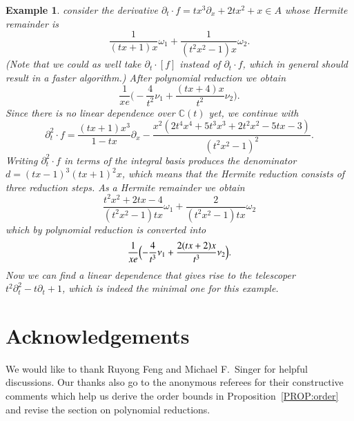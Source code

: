 \documentclass[final,1p,times,authoryear]{elsarticle}
\newtheorem{example}[theorem]{Example}
\newcommand{\bC}{ {\mathbb C}}
\begin{document}
\begin{example}
consider the derivative $\partial_t\cdot f=tx^3\partial_x+2tx^2+x\in A$ whose
Hermite remainder is
\[
  \frac{1}{(tx+1)x} \omega_1 + \frac{1}{(t^2x^2-1)x} \omega_2.
\]
(Note that we could as well take $\partial_t\cdot [f]$ instead of $\partial_t\cdot f$, which
in general should result in a faster algorithm.)
After polynomial reduction we obtain
\[
  \frac{1}{xe} \biggl( -\frac{4}{t^2} \nu_1 + \frac{(tx+4)x}{t^2} \nu_2 \biggr).
\]
Since there is no linear dependence over $\bC(t)$ yet, we continue with
\[
  \partial_t^2\cdot f =
  \frac{(tx+1)x^3}{1-tx} \partial_x -
  \frac{x^2(2t^4x^4+5t^3x^3+2t^2x^2-5tx-3)}{(t^2x^2-1)^2}.
\]
Writing $\partial_t^2\cdot f$ in terms of the integral basis produces the denominator
$d=(tx-1)^3(tx+1)^2x$, which means that the Hermite reduction consists of three
reduction steps. As a Hermite remainder we obtain
\[
  \frac{t^2x^2+2tx-4}{(t^2x^2-1)tx} \omega_1 + \frac{2}{(t^2x^2-1)tx} \omega_2
\]
which by polynomial reduction is converted into
\[
  \frac{1}{xe} \Bigl( -\frac{4}{t^3} \nu_1 + \frac{2(tx+2)x}{t^3} \nu_2 \Bigr).
\]
Now we can find a linear dependence that gives rise to the telescoper
$t^2\partial_t^2-t\partial_t+1$, which is indeed the minimal one for this example.
\end{example}

\section*{Acknowledgements}

We would like to thank Ruyong Feng and Michael F.\ Singer for helpful discussions.
Our thanks also go to the anonymous referees for their constructive comments which help
us derive the order bounds in Proposition~\ref{PROP:order} and revise the section on
polynomial reductions.



\end{document}
